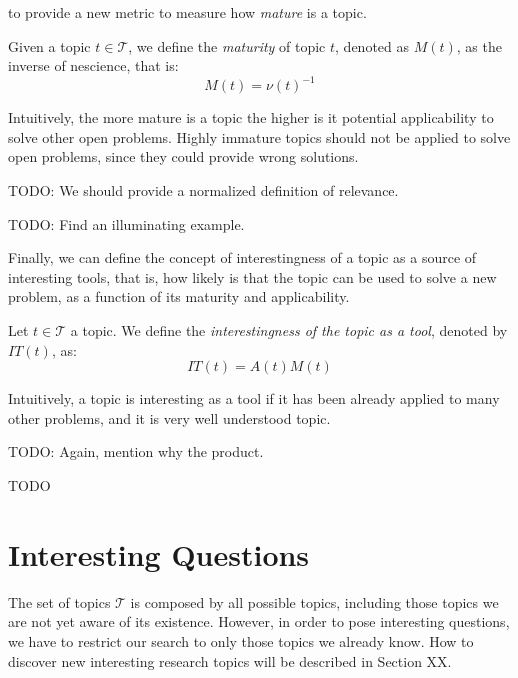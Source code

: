 to provide a new metric to measure how \emph{mature} is a topic.

\begin{definition}
Given a topic $t \in \mathcal{T}$, we define the \emph{maturity} of topic $t$, denoted as $M(t)$, as the inverse of nescience, that is:
\[
M(t) = \nu(t)^{-1}
\]
\end{definition}

Intuitively, the more mature is a topic the higher is it potential applicability to solve other open problems. Highly immature topics should not be applied to solve open problems, since they could provide wrong solutions.

{\color{red} TODO: We should provide a normalized definition of relevance.}

\begin{example}
{\color{red} TODO: Find an illuminating example.}
\end{example}

Finally, we can define the concept of interestingness of a topic as a source of interesting tools, that is, how likely is that the topic can be used to solve a new problem, as a function of its maturity and applicability.

\begin{definition}
Let $t \in \mathcal{T}$ a topic. We define the \emph{interestingness of the topic as a tool}, denoted by $IT(t)$, as:
\[
IT(t) = A(t) M(t)
\]
\end{definition}

Intuitively, a topic is interesting as a tool if it has been already applied to many other problems, and it is very well understood topic.

{\color{red} TODO: Again, mention why the product.}

\begin{example}
{\color{red} TODO}
\end{example}

%
%

\section{Interesting Questions}

The set of topics $\mathcal{T}$ is composed by all possible topics, including those topics we are not yet aware of its existence. However, in order to pose interesting questions, we have to restrict our search to only those topics we already know. How to discover new interesting research topics will be described in Section XX.

